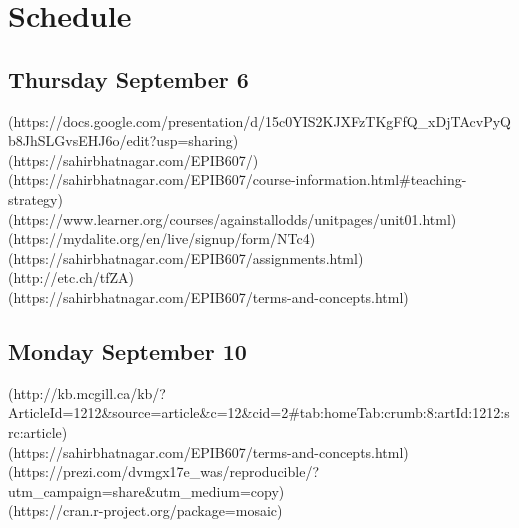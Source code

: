 \documentclass[]{book}
\let\originaltabular\tabular
\let\endoriginaltabular\endtabular
\renewenvironment{tabular}[1]{%
  \begingroup%
  \centering%
  \originaltabular{#1}}%
  {\endoriginaltabular\endgroup}
\theoremstyle{definition}
\theoremstyle{definition}
\theoremstyle{definition}
\theoremstyle{remark}
\begin{document}
\chapter{Schedule}\label{schedule}

\section{Thursday September 6}\label{thursday-september-6}

\begin{table}[H]
\centering
\begin{tabular}{l}
(https://docs.google.com/presentation/d/15c0YIS2KJXFzTKgFfQ\_xDjTAcvPyQb8JhSLGvsEHJ6o/edit?usp=sharing)\\
(https://sahirbhatnagar.com/EPIB607/)\\
(https://sahirbhatnagar.com/EPIB607/course-information.html\#teaching-strategy)\\
(https://www.learner.org/courses/againstallodds/unitpages/unit01.html)\\
(https://mydalite.org/en/live/signup/form/NTc4)\\
(https://sahirbhatnagar.com/EPIB607/assignments.html)\\
(http://etc.ch/tfZA)\\
(https://sahirbhatnagar.com/EPIB607/terms-and-concepts.html)\\
\hline
\end{tabular}
\end{table}

\section{Monday September 10}\label{monday-september-10}

\begin{table}[H]
\centering
\begin{tabular}{l}
(http://kb.mcgill.ca/kb/?ArticleId=1212\&source=article\&c=12\&cid=2\#tab:homeTab:crumb:8:artId:1212:src:article)\\
(https://sahirbhatnagar.com/EPIB607/terms-and-concepts.html)\\
(https://prezi.com/dvmgx17e\_was/reproducible/?utm\_campaign=share\&utm\_medium=copy)\\
(https://cran.r-project.org/package=mosaic)\\
\hline
\end{tabular}
\end{table}
\end{document}
